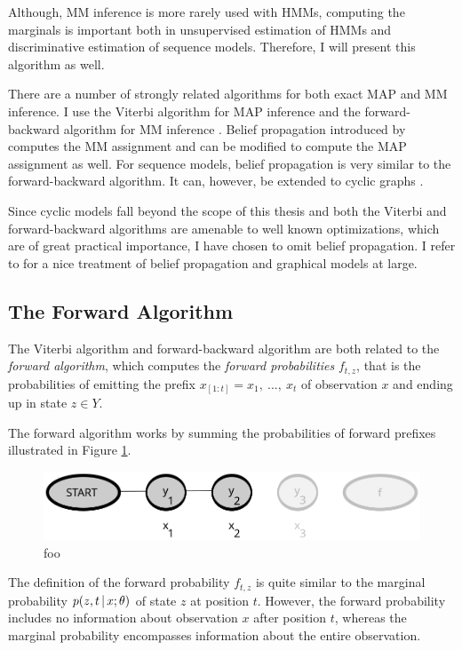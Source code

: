 Although, MM inference is more rarely used with HMMs, computing the
marginals is important both in unsupervised estimation of HMMs and
discriminative estimation of sequence models. Therefore, I will
present this algorithm as well.

There are a number of strongly related algorithms for both exact MAP
and MM inference. I use the Viterbi algorithm for MAP inference and
the forward-backward algorithm for MM inference
\citep{Rabiner1989}. Belief propagation introduced by \cite{Peral1982}
computes the MM assignment and can be modified to compute the MAP
assignment as well. For sequence models, belief propagation is very
similar to the forward-backward algorithm. It can, however, be
extended to cyclic graphs \citep{Weiss2000}. 

Since cyclic models fall beyond the scope of this thesis and both the
Viterbi and forward-backward algorithms are amenable to well known
optimizations, which are of great practical importance, I have chosen
to omit belief propagation. I refer to \cite{Koller2009} for a nice
treatment of belief propagation and graphical models at large.

\subsection{The Forward Algorithm}

The Viterbi algorithm and forward-backward algorithm are both related
to the {\it forward algorithm}, which computes the {\it forward
  probabilities} $f_{t,z}$, that is the probabilities of emitting the
prefix $x_{[1:t]} = x_1,\ ...,\ x_t$ of observation $x$ and ending up
in state $z \in Y$.

The forward algorithm works by summing the probabilities of forward
prefixes illustrated in Figure \ref{hmm-path-prefix}.

\begin{figure}
\begin{center}
\caption{foo}\label{hmm-path-prefix}
\includegraphics[scale=0.5]{forward_prefix}
\end{center}
\end{figure}

The definition of the forward probability $f_{t,z}$ is quite similar
to the marginal probability $p(z, t \mbox{$ \, | \, $} x\mbox{$ ; \, $}\theta)$ of state
$z$ at position $t$. However, the forward probability includes no
information about observation $x$ after position $t$, whereas the
marginal probability encompasses information about the entire
observation.

